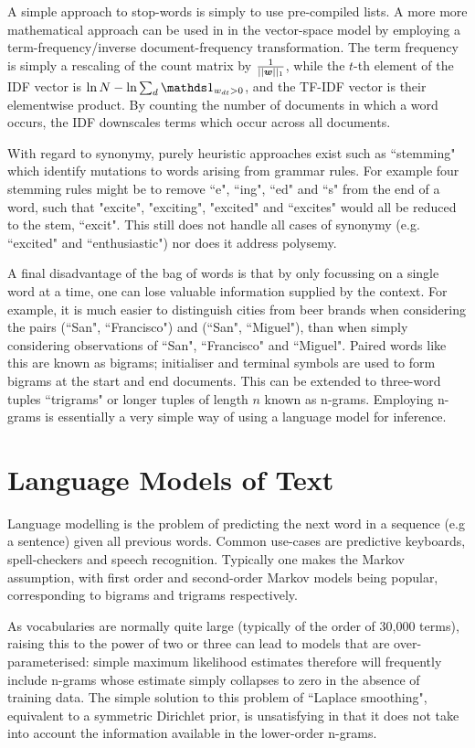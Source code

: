 A simple approach to stop-words is simply to use pre-compiled lists. A more more mathematical approach can be used in in the vector-space model by employing a term-frequency/inverse document-frequency transformation. The term frequency is simply a rescaling of the count matrix by $\frac{1}{||\bm w||_1}$, while the $t$-th element of the IDF vector is $\ln N - \ln \sum_d \one_{w_{dt} > 0}$, and the TF-IDF vector is their elementwise product. By counting the number of documents in which a word occurs, the IDF downscales terms which occur across all documents. 

With regard to synonymy, purely heuristic approaches exist such as ``stemming" which identify mutations to words arising from grammar rules. For example four stemming rules might be to remove ``e", ``ing", ``ed" and ``s" from the end of a word, such that "excite", "exciting", "excited" and ``excites" would all be reduced to the stem, ``excit". This still does not handle all cases of synonymy (e.g. ``excited" and ``enthusiastic") nor does it address polysemy.

A final disadvantage of the bag of words is that by only focussing on a single word at a time, one can lose valuable information supplied by the context. For example, it is much easier to distinguish cities from beer brands when considering the pairs (``San", ``Francisco") and (``San", ``Miguel"), than when simply considering observations of ``San", ``Francisco" and ``Miguel". Paired words like this are known as bigrams; initialiser and terminal symbols are used to form bigrams at the start and end documents. This can be extended to three-word tuples ``trigrams" or longer tuples of length $n$ known as n-grams. Employing n-grams is essentially a very simple way of using a language model for inference.


\section{Language Models of Text}
\label{sec:langmodels}
Language modelling is the problem of predicting the next word in a sequence (e.g a sentence) given all previous words. Common use-cases are predictive keyboards, spell-checkers and speech recognition. Typically one makes the Markov assumption, with first order and second-order Markov models being popular, corresponding to bigrams and trigrams respectively.

As vocabularies are normally quite large (typically of the order of 30,000 terms), raising this to the power of two or three can lead to models that are over-parameterised: simple maximum likelihood estimates therefore will frequently include n-grams whose estimate simply collapses to zero in the absence of training data. The simple solution to this problem  of ``Laplace smoothing", equivalent to a symmetric Dirichlet prior, is unsatisfying in that it does not take into account the information available in the lower-order n-grams.

